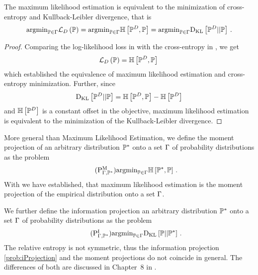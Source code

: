 \begin{lemma}
    \label{lem:centropyMLE}
    The maximum likelihood estimation  is equivalent to the minimization of cross-entropy and Kullback-Leibler divergence, that is
    \begin{align*}
        \mathrm{argmin}_{\mathbb{P}\in\Gamma} \mathcal{L}_{D}\left(\mathbb{P}\right)
        = \mathrm{argmin}_{\mathbb{P}\in\Gamma} \mathbb{H}\left[\mathbb{P}^{D},\mathbb{P}\right]
        = \mathrm{argmin}_{\mathbb{P}\in\Gamma} \mathrm{D}_{\mathrm{KL}}\left[ \mathbb{P}^{D} || \mathbb{P} \right] \, .
    \end{align*}
\end{lemma}
\begin{proof}
    Comparing the log-likelihood loss in  with the cross-entropy in , we get
    \begin{align*}
        \mathcal{L}_{D}\left(\mathbb{P}\right) = \mathbb{H}\left[\mathbb{P}^{D},\mathbb{P}\right] \,
    \end{align*}
    which established the equivalence of maximum likelihood estimation and cross-entropy minimization.
    Further, since
    \begin{align*}
        \mathrm{D}_{\mathrm{KL}}\left[ \mathbb{P}^{D} || \mathbb{P} \right] = \mathbb{H}\left[\mathbb{P}^{D},\mathbb{P}\right] - \mathbb{H}\left[\mathbb{P}^{D}\right]
    \end{align*}
    and $\mathbb{H}\left[\mathbb{P}^{D}\right]$ is a constant offset in the objective, maximum likelihood estimation is equivalent to the minimization of the Kullback-Leibler divergence.
\end{proof}

More general than Maximum Likelihood Estimation, we define the moment projection of an arbitrary distribution $\mathbb{P}^*$ onto a set $\Gamma$ of probability distributions as the problem
\begin{align}
    \label{prob:mProjection}\tag{$\probtagtypeinst{\mprojectionsymbol}{\probtensorset,\gendistribution}$}
    \argmin_{\probtensorin} \centropyof{\gendistribution}{\probtensor} \, . %
\end{align}
With  we have established, that maximum likelihood estimation is the moment projection of the empirical distribution onto a set $\Gamma$.

We further define the information projection an arbitrary distribution $\mathbb{P}^*$ onto a set $\Gamma$ of probability distributions as the problem
\begin{align}
    \label{prob:iProjection}\tag{$\probtagtypeinst{\iprojectionsymbol}{\probtensorset,\gendistribution}$}
    \argmin_{\probtensorin} \kldivof{\probtensor}{\gendistribution} \, .
\end{align}
The relative entropy is not symmetric, thus the information projection \eqref{prob:iProjection} and the moment projections do not coincide in general.
The differences of both are discussed in Chapter~8 in \cite{koller_probabilistic_2009}.

